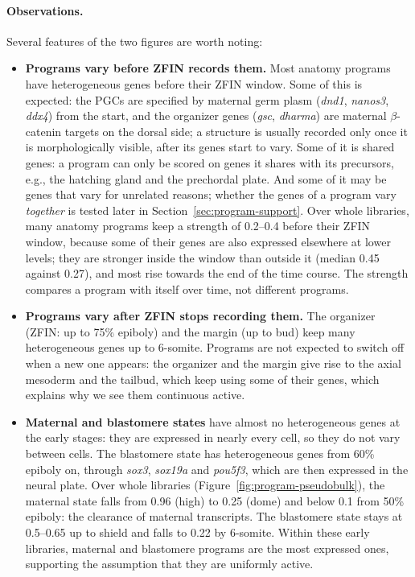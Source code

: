 \documentclass[11pt,a4paper]{article}
\begin{document}
\paragraph{Observations.} Several features of the two figures are worth noting:
\begin{itemize}
	\item \textbf{Programs vary before ZFIN records them.} Most anatomy programs have heterogeneous genes before their ZFIN window. Some of this is expected: the PGCs are specified by maternal germ plasm (\emph{dnd1}, \emph{nanos3}, \emph{ddx4}) from the start, and the organizer genes (\emph{gsc}, \emph{dharma}) are maternal $\beta$-catenin targets on the dorsal side; a structure is usually recorded only once it is morphologically visible, after its genes start to vary. Some of it is shared genes: a program can only be scored on genes it shares with its precursors, e.g., the hatching gland and the prechordal plate. And some of it may be genes that vary for unrelated reasons; whether the genes of a program vary \emph{together} is tested later in Section~\ref{sec:program-support}. Over whole libraries, many anatomy programs keep a strength of 0.2--0.4 before their ZFIN window, because some of their genes are also expressed elsewhere at lower levels; they are stronger inside the window than outside it (median 0.45 against 0.27), and most rise towards the end of the time course. The strength compares a program with itself over time, not different programs.
	\item \textbf{Programs vary after ZFIN stops recording them.} The organizer (ZFIN: up to 75\% epiboly) and the margin (up to bud) keep many heterogeneous genes up to 6-somite. Programs are not expected to switch off when a new one appears: the organizer and the margin give rise to the axial mesoderm and the tailbud, which keep using some of their genes, which explains why we see them continuous active.
	\item \textbf{Maternal and blastomere states} have almost no heterogeneous genes at the early stages: they are expressed in nearly every cell, so they do not vary between cells. The blastomere state has heterogeneous genes from 60\% epiboly on, through \emph{sox3}, \emph{sox19a} and \emph{pou5f3}, which are then expressed in the neural plate. Over whole libraries (Figure~\ref{fig:program-pseudobulk}), the maternal state falls from 0.96 (high) to 0.25 (dome) and below 0.1 from 50\% epiboly: the clearance of maternal transcripts. The blastomere state stays at 0.5--0.65 up to shield and falls to 0.22 by 6-somite. Within these early libraries, maternal and blastomere programs are the most expressed ones, supporting the assumption that they are uniformly active.

\end{itemize}
\end{document}
